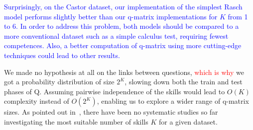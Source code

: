 \documentclass{sig-alternate}
\newcommand\alert[1]{\textcolor{red}{#1}}
\newcommand\note[1]{\textcolor{blue}{#1}}
\begin{document}


\note{Surprisingly, on the Castor dataset, our implementation of the simplest Rasch model performs slightly better than our q-matrix implementations for $K$ from 1 to 6. In order to address this problem, both models should be compared to a more conventional dataset such as a simple calculus test, requiring fewest competences. Also, a better computation of q-matrix using more cutting-edge techniques could lead to other results.} %




We made no hypothesis at all on the links between questions, \alert{which is why} we got a probability distribution of size $2^K$, slowing down both the train and test phases of Q. Assuming pairwise independence of the skills would lead to $O(K)$ complexity instead of $O(2^K)$, enabling us to explore a wider range of q-matrix sizes. As pointed out in~\cite{Huebner2010}, there have been no systematic studies so far investigating the most suitable number of skills $K$ for a given dataset.
\end{document}

